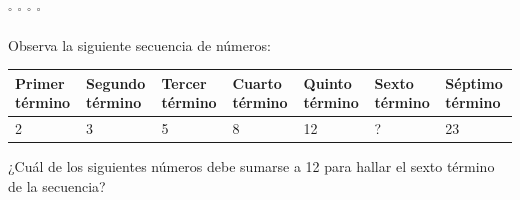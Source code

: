 \documentclass[10pt,letterpaper,addpoints]{exam}
\begin{document}
\begin{questions}
\begin{oneparchoices}
$^{\circ}$
$^{\circ}$
$^{\circ}$
$^{\circ}$
\end{oneparchoices}
\question Observa la siguiente secuencia de números:
\begin{center}
\begin{tabular}{|p{1.5cm}|p{1.5cm}|p{1.5cm}|p{1.5cm}|p{1.5cm}|p{1.5cm}|p{1.5cm}|}
\hline 
\textbf{Primer término} & \textbf{Segundo término} & \textbf{Tercer término} & \textbf{Cuarto término} & \textbf{Quinto término} & \textbf{Sexto término} & \textbf{Séptimo término} \\ 
\hline 
2 & 3 & 5 & 8 & 12 & ? & 23 \\ 
\hline 
\end{tabular} 
\end{center}
¿Cuál de los siguientes números debe sumarse a 12 para hallar el sexto término de la secuencia?

\begin{oneparchoices}
\end{oneparchoices}
\end{questions}
\end{document}
